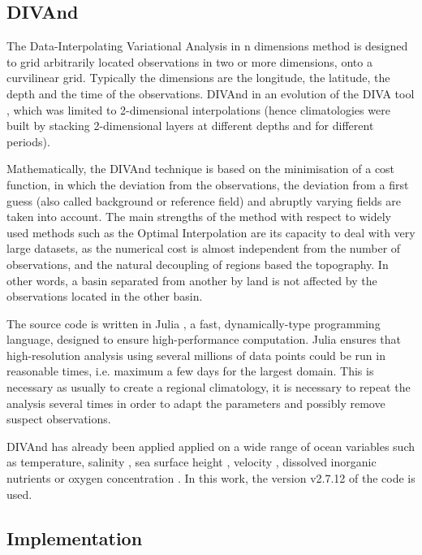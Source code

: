 \documentclass[essd,manuscript]{copernicus}
\begin{document}
\subsection{DIVAnd\label{sec:divandmethod}}

The Data-Interpolating Variational Analysis in n dimensions method \citep[DIVAnd][]{BARTH2014} is designed to grid arbitrarily located observations in two or more dimensions, onto a curvilinear grid. Typically the dimensions are the longitude, the latitude, the depth and the time of the observations. DIVAnd in an evolution of the DIVA tool \citep{TROUPIN2012,BECKERS2014}, which was limited to 2-dimensional interpolations (hence climatologies were built by stacking 2-dimensional layers at different depths and for different periods). 

Mathematically, the DIVAnd technique is based on the minimisation of a cost function, in which the deviation from the observations, the deviation from a first guess (also called background or reference field) and abruptly varying fields are taken into account. The main strengths of the method with respect to widely used methods such as the Optimal Interpolation \citep[OI,][]{GANDIN1966,BRETHERTON1976} are its capacity to deal with very large datasets, as the numerical cost is almost independent from the number of observations, and the natural decoupling of regions based the topography. In other words, a basin separated from another by land is not affected by the observations located in the other basin.

The source code is written in Julia \citep{Bezanson2017}, a fast, dynamically-type programming language, designed to ensure high-performance computation. Julia ensures that high-resolution analysis using several millions of data points could be run in reasonable times, i.e. maximum a few days for the largest domain. This is necessary as usually to create a regional climatology, it is necessary to repeat the analysis several times in order to adapt the parameters and possibly remove suspect observations.

DIVAnd has already been applied applied on a wide range of ocean variables such as temperature, salinity \citep{COATANOAN2021}, sea surface height \citep{DOGLIONI2023}, velocity \citep{TROUPIN2022}, dissolved inorganic nutrients \citep{BELGACEM2021} or oxygen concentration \citep{CLIMATO2023}. In this work, the version v2.7.12 of the code \citep{BARTH2024DIVAnd} is used.

\subsection{Implementation}
\end{document}
